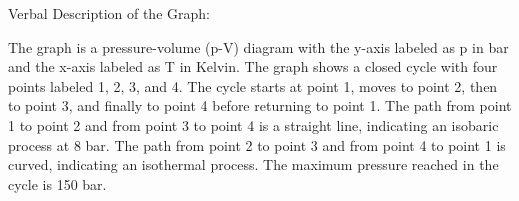 Verbal Description of the Graph:

The graph is a pressure-volume (p-V) diagram with the y-axis labeled as p in bar and the x-axis labeled as T in Kelvin. The graph shows a closed cycle with four points labeled 1, 2, 3, and 4. The cycle starts at point 1, moves to point 2, then to point 3, and finally to point 4 before returning to point 1. The path from point 1 to point 2 and from point 3 to point 4 is a straight line, indicating an isobaric process at 8 bar. The path from point 2 to point 3 and from point 4 to point 1 is curved, indicating an isothermal process. The maximum pressure reached in the cycle is 150 bar.